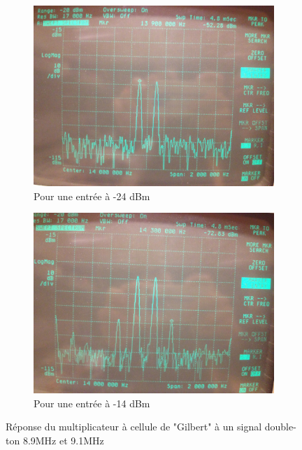 \documentclass{article}
\begin{document}
\begin{figure}[h]
	\centering
	\begin{subfigure}[b]{0.45\textwidth}
		\centering
		\includegraphics[width=\textwidth]{8_3_4-18dbm}
		\caption{Pour une entrée à -24 dBm}
		\label{fig:gilbert_s1}
	\end{subfigure}
	\hfill
	\begin{subfigure}[b]{0.45\textwidth}
		\centering
		\includegraphics[width=\textwidth]{8_3_4-8dbm}
		\caption{Pour une entrée à -14 dBm}
		\label{fig:gilbert_s2}
	\end{subfigure}
	\caption{Réponse du multiplicateur à cellule de "Gilbert" à un signal double-ton 8.9MHz et 9.1MHz}
	\label{fig:gilbert_s}
\end{figure}
\end{document}

